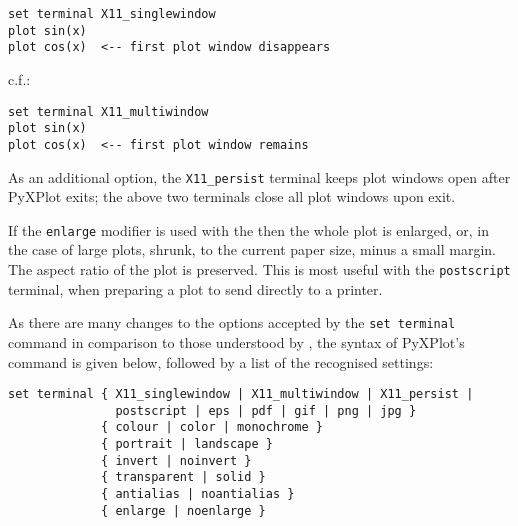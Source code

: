 \begin{verbatim} 
set terminal X11_singlewindow
plot sin(x)
plot cos(x)  <-- first plot window disappears
\end{verbatim}

\noindent c.f.:

\begin{verbatim} 
set terminal X11_multiwindow
plot sin(x)
plot cos(x)  <-- first plot window remains
\end{verbatim}

As an additional option, the {\tt X11\_persist} terminal keeps plot windows
open after PyXPlot exits; the above two terminals close all plot windows upon
exit.

If the {\tt enlarge} modifier is used with the  then the
whole plot is enlarged, or, in the case of large plots, shrunk, to the current
paper size, minus a small margin. The aspect ratio of the plot is preserved.
This is most useful with the {\tt postscript} terminal, when preparing a plot
to send directly to a printer.

As there are many changes to the options accepted by the {\tt set terminal}
command in comparison to those understood by \gnuplot, the syntax of PyXPlot's
command is given below, followed by a list of the recognised settings:

\begin{verbatim} 
set terminal { X11_singlewindow | X11_multiwindow | X11_persist |
               postscript | eps | pdf | gif | png | jpg }
             { colour | color | monochrome }
             { portrait | landscape }
             { invert | noinvert }
             { transparent | solid }
             { antialias | noantialias }
             { enlarge | noenlarge }
\end{verbatim}

\newpage %

